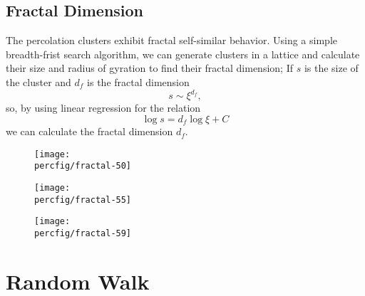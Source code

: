 \documentclass[12pt,a4paper]{article}
\newcommand{\percfig}{../fig/percolation}
\begin{document}
	\subsection{Fractal Dimension}
	The percolation clusters exhibit fractal self-similar behavior. Using a simple breadth-frist search algorithm,
	we can generate clusters in a lattice and calculate their size and radius of gyration to find their
	fractal dimension; If $s$ is the size of the cluster and $d_f$ is the fractal dimension
	\begin{equation}
		s \sim \xi^{d_f},
	\end{equation}
	so, by using linear regression for the relation
	\begin{equation}
		\log{s} = d_f\log{\xi} + C
	\end{equation}
	we can calculate the fractal dimension $d_f$.
	\begin{figure}[htb!]
		\centering
		\texttt{[image: \\percfig/fractal-50]}
	\end{figure}
	\begin{figure}[htb!]
		\centering
		\texttt{[image: \\percfig/fractal-55]}
	\end{figure}
	\begin{figure}[htb!]
		\centering
		\texttt{[image: \\percfig/fractal-59]}
	\end{figure}
	\section{Random Walk}
\end{document}
